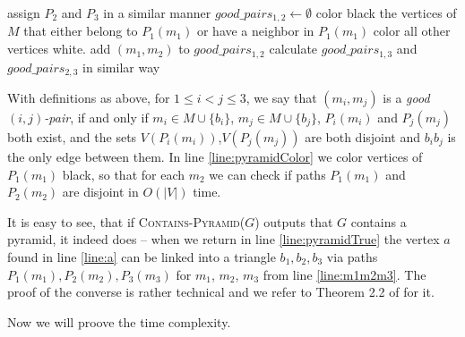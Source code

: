 \begin{algorithmic}[1]
				\ls assign $P_2$ and $P_3$ in a similar manner
				\ls $good\_pairs_{1,2} \gets \emptyset$ 
				 
						\ls color black the vertices of $M$ that either belong to \label{line:pyramidColor}
						\lsx $P_1(m_1)$ or have a neighbor in $P_1(m_1)$
						\lsx color all other vertices white.
							 \label{line:pyramidColor2}
								\ls add $(m_1, m_2)$ to $good\_pairs_{1,2}$
							\mEndIf
						\mEndFor
					\mEndIf
				\mEndFor
				\ls calculate $good\_pairs_{1,3}$ and $good\_pairs_{2,3}$ in similar way
				 \label{line:m1m2m3}
						\ls \RETURN \TRUE \label{line:pyramidTrue}
					\mEndIf
				\mEndFor
			\mEndIf \label{line:pyramidEnd}
		\mEndFor
	\mEndFor
	\ls \RETURN \FALSE
	\mEndProcedure
\end{algorithmic}

With definitions as above, for $1 \leq i < j \leq 3$, we say that $(m_i, m_j)$ is a \emph{good $(i, j)$-pair}, if and only if $m_i \in M \cup \{b_i\}$, $m_j \in M \cup \{b_j\}$, $P_i(m_i)$ and $P_j(m_j)$ both exist, and the sets $V(P_i(m_i))$,$V(P_j(m_j))$ are both disjoint and $b_ib_j$ is the only edge between them. In line \ref{line:pyramidColor} we color vertices of $P_1(m_1)$ black, so that for each $m_2$ we can check if paths $P_1(m_1)$ and $P_2(m_2)$ are disjoint in $O(|V|)$ time.

It is easy to see, that if \textsc{Contains-Pyramid($G$)} outputs that $G$ contains a pyramid, it indeed does -- when we return in line \ref{line:pyramidTrue} the vertex $a$ found in line \ref{line:a} can be linked into a triangle $b_1, b_2, b_3$ via paths $P_1(m_1), P_2(m_2), P_3(m_3)$ for $m_1$, $m_2$, $m_3$ from line \ref{line:m1m2m3}. The proof of the converse is rather technical and we refer to Theorem 2.2 of \cite{MC05} for it.

Now we will proove the time complexity.

